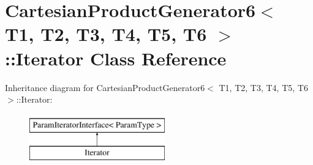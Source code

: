 \hypertarget{classtesting_1_1internal_1_1CartesianProductGenerator6_1_1Iterator}{\section{\-Cartesian\-Product\-Generator6$<$ \-T1, \-T2, \-T3, \-T4, \-T5, \-T6 $>$\-:\-:\-Iterator \-Class \-Reference}
\label{db/d9d/classtesting_1_1internal_1_1CartesianProductGenerator6_1_1Iterator}
}
\-Inheritance diagram for \-Cartesian\-Product\-Generator6$<$ \-T1, \-T2, \-T3, \-T4, \-T5, \-T6 $>$\-:\-:\-Iterator\-:\begin{figure}[H]
\begin{center}
\leavevmode
\includegraphics[height=2.000000cm]{db/d9d/classtesting_1_1internal_1_1CartesianProductGenerator6_1_1Iterator}
\end{center}
\end{figure}
